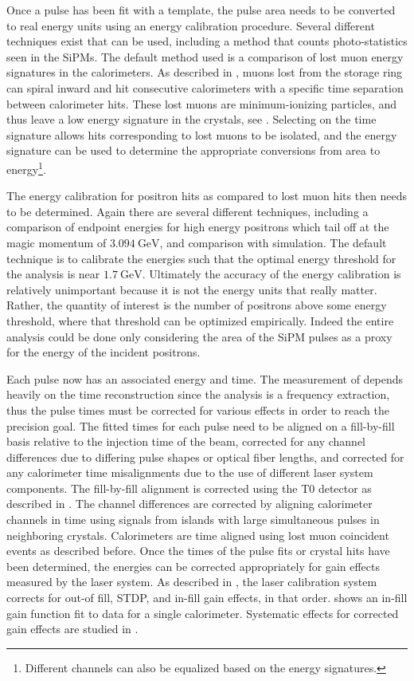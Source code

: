 Once a pulse has been fit with a template, the pulse area needs to be converted to real energy units using an energy calibration procedure. Several different techniques exist that can be used, including a method that counts photo-statistics seen in the SiPMs. The default method used is a comparison of lost muon energy signatures in the calorimeters. As described in , muons lost from the storage ring can spiral inward and hit consecutive calorimeters with a specific time separation between calorimeter hits. These lost muons are minimum-ionizing particles, and thus leave a low energy signature in the crystals, see . Selecting on the time signature allows hits corresponding to lost muons to be isolated, and the energy signature can be used to determine the appropriate conversions from area to energy\footnote{Different channels can also be equalized based on the energy signatures.}. 


The energy calibration for positron hits as compared to lost muon hits then needs to be determined. Again there are several different techniques, including a comparison of endpoint energies for high energy positrons which tail off at the magic momentum of $\SI{3.094}{\GeV}$, and comparison with simulation. The default technique is to calibrate the energies such that the optimal energy threshold for the \wa analysis is near $\SI{1.7}{\GeV}$. Ultimately the accuracy of the energy calibration is relatively unimportant because it is not the energy units that really matter. Rather, the quantity of interest is the number of positrons above some energy threshold, where that threshold can be optimized empirically. Indeed the entire \wa analysis could be done only considering the area of the SiPM pulses as a proxy for the energy of the incident positrons.


Each pulse now has an associated energy and time. The measurement of \wa depends heavily on the time reconstruction since the analysis is a frequency extraction, thus the pulse times must be corrected for various effects in order to reach the precision goal. The fitted times for each pulse need to be aligned on a fill-by-fill basis relative to the injection time of the beam, corrected for any channel differences due to differing pulse shapes or optical fiber lengths, and corrected for any calorimeter time misalignments due to the use of different laser system components. The fill-by-fill alignment is corrected using the T0 detector as described in . The channel differences are corrected by aligning calorimeter channels in time using signals from islands with large simultaneous pulses in neighboring crystals. Calorimeters are time aligned using lost muon coincident events as described before. Once the times of the pulse fits or crystal hits have been determined, the energies can be corrected appropriately for gain effects measured by the laser system. As described in , the laser calibration system corrects for out-of fill, STDP, and in-fill gain effects, in that order.  shows an in-fill gain function fit to data for a single calorimeter. Systematic effects for corrected gain effects are studied in .

